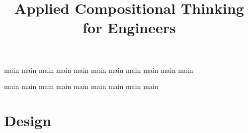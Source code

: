 \pagestyle{scrheadings}

\ohead{\pagemark}
\ihead{\headmark}
\cfoot{}
\dominitoc
\doparttoc
\setcounter{parttocdepth}{0}
\setcounter{minitocdepth}{1}

\title{Applied Compositional Thinking\\ for Engineers}
\date{}





\setcounter{tocdepth}{1}



\tableofcontents

\devel{

}

{main}
{main}
{main}
{main}
{main}
{main}
{main}
{main}
{main}
{main}
{main}

{main}
{main}
{main}
{main}
{main}
{main}
{main}
{main}
{main}


\part{Design}
\label{part:co-design}

